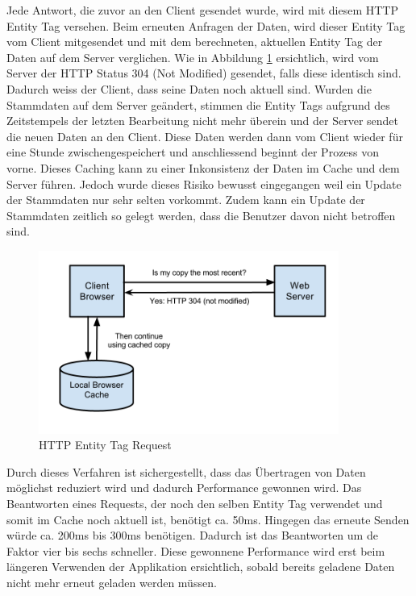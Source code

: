Jede Antwort, die zuvor an den Client gesendet wurde, wird mit diesem HTTP Entity Tag versehen. Beim erneuten Anfragen der Daten, wird dieser Entity Tag vom Client mitgesendet und mit dem berechneten, aktuellen Entity Tag der Daten auf dem Server verglichen. Wie in Abbildung \ref{pic:browser_etag} ersichtlich, wird vom Server der HTTP Status 304 (Not Modified) \cite{W3HttpStatus} gesendet, falls diese identisch sind. Dadurch weiss der Client, dass seine Daten noch aktuell sind. Wurden die Stammdaten auf dem Server geändert, stimmen die Entity Tags aufgrund des Zeitstempels der letzten Bearbeitung nicht mehr überein und der Server sendet die neuen Daten an den Client. Diese Daten werden dann vom Client wieder für eine Stunde zwischengespeichert und anschliessend beginnt der Prozess von vorne. Dieses Caching kann zu einer Inkonsistenz der Daten im Cache und dem Server führen. Jedoch wurde dieses Risiko bewusst eingegangen weil ein Update der Stammdaten nur sehr selten vorkommt. Zudem kann ein Update der Stammdaten zeitlich so gelegt werden, dass die Benutzer davon nicht betroffen sind.
\begin{figure}[H]
\centering
\includegraphics[height=6cm]{images/browser_etag.jpg}
\caption{HTTP Entity Tag Request \cite{HTTPCacheHeaders}}
\label{pic:browser_etag}
\end{figure}
\noindent
Durch dieses Verfahren ist sichergestellt, dass das Übertragen von Daten möglichst reduziert wird und dadurch Performance gewonnen wird. Das Beantworten eines Requests, der noch den selben Entity Tag verwendet und somit im Cache noch aktuell ist, benötigt ca. 50ms. Hingegen das erneute Senden würde ca. 200ms bis 300ms benötigen. Dadurch ist das Beantworten um de Faktor vier bis sechs schneller. Diese gewonnene Performance wird erst beim längeren Verwenden der Applikation ersichtlich, sobald bereits geladene Daten nicht mehr erneut geladen werden müssen.
\newpage
